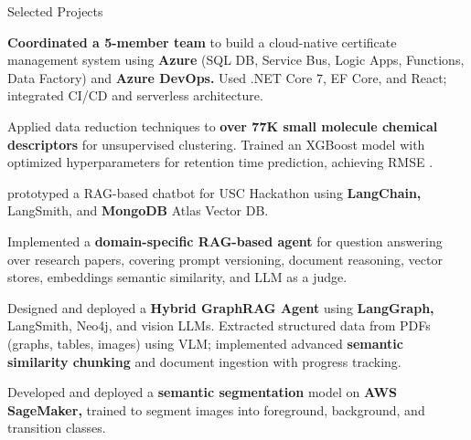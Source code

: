 \begin{cventries}
\cventry
    {}
    {Selected Projects}
    {}
    {}
    {
        \begin{cvitemsfree}
            \item{\textbf{Coordinated a 5-member team} to build a cloud-native certificate management system using \textbf{Azure} (SQL DB, Service Bus, Logic Apps, Functions, Data Factory) and \textbf{Azure DevOps.} Used .NET Core 7, EF Core, and React; integrated CI/CD and serverless architecture.}
            \item{Applied data reduction techniques to \textbf{over 77K small molecule chemical descriptors} for unsupervised clustering. Trained an XGBoost model with optimized hyperparameters for retention time prediction, achieving RMSE \approx {}.}
            \item{prototyped a RAG-based chatbot for USC Hackathon using \textbf{LangChain,} LangSmith, and \textbf{MongoDB} Atlas Vector DB.}
            \item{Implemented a \textbf{domain-specific RAG-based agent} for question answering over research papers, covering prompt versioning, document reasoning, vector stores, embeddings semantic similarity, and LLM as a judge.}
            \item{Designed and deployed a \textbf{Hybrid GraphRAG Agent} using \textbf{LangGraph,} LangSmith, Neo4j, and vision LLMs. Extracted structured data from PDFs (graphs, tables, images) using VLM; implemented advanced \textbf{semantic similarity chunking} and document ingestion with progress tracking.}
            \item{Developed and deployed a \textbf{semantic segmentation} model on \textbf{AWS SageMaker,} trained to segment images into foreground, background, and transition classes.}
        \end{cvitemsfree}
    }


\end{cventries}
